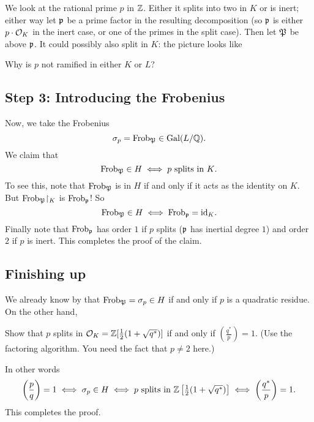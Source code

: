 We look at the rational prime $p$ in $\mathbb Z$.
Either it splits into two in $K$ or is inert; either way let $\mathfrak p$ be a prime factor
in the resulting decomposition (so $\mathfrak p$ is either $p \cdot \mathcal O_K$ in the inert case,
or one of the primes in the split case).
Then let ${\mathfrak P}$ be above $\mathfrak p$.
It could possibly also split in $K$: the picture looks like
\begin{center}
\end{center}
\begin{ques}
	Why is $p$ not ramified in either $K$ or $L$?
\end{ques}

\subsection{Step 3: Introducing the Frobenius}
Now, we take the Frobenius 
\[ \sigma_p = \mathrm{Frob}_{\mathfrak P} \in \operatorname{Gal}(L/\mathbb Q). \]
We claim that
\[ \mathrm{Frob}_{\mathfrak P} \in H \iff \text{$p$ splits in $K$}. \]
To see this, note that $\mathrm{Frob}_{\mathfrak P}$ is in $H$ if and only if it acts
as the identity on $K$.
But $\Frob_{\kP} \restrict{K}$ is $\mathrm{Frob}_\mathfrak p$!
So \[ \mathrm{Frob}_{\mathfrak P} \in H \iff \mathrm{Frob}_\mathfrak p = \mathrm{id}_K. \]
Finally note that $\mathrm{Frob}_\mathfrak p$ has order $1$ if $p$ splits
($\mathfrak p$ has inertial degree $1$)
and order $2$ if $p$ is inert.
This completes the proof of the claim.

\subsection{Finishing up}
We already know by  that $\mathrm{Frob}_{\mathfrak P} = \sigma_p \in H$
if and only if $p$ is a quadratic residue.
On the other hand,
\begin{exercise}
	Show that $p$ splits in $\mathcal O_K = \mathbb Z[\frac12(1+\sqrt{q^\ast})]$
	if and only if $\left( \frac{q^\ast}{p} \right) = 1$.
	(Use the factoring algorithm. You need the fact that $p \neq 2$ here.)
\end{exercise}
In other words
\[ \left( \frac pq \right) = 1
	\iff \sigma_p \in H \iff \text{$p$ splits in $\mathbb Z\left[ \tfrac12(1+\sqrt{q^\ast}) \right]$}
	\iff \left( \frac{q^\ast}{p} \right) = 1.
\]
This completes the proof.


